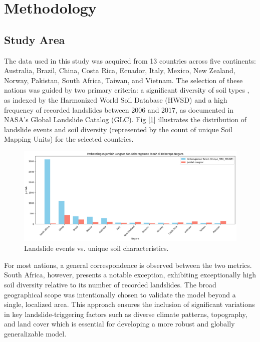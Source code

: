 \section{Methodology}




\subsection{Study Area}
The data used in this study was acquired from 13 countries across five continents: Australia, Brazil, China, Costa Rica, Ecuador, Italy, Mexico, New Zealand, Norway, Pakistan, South Africa, Taiwan, and Vietnam. The selection of these nations was guided by two primary criteria: a significant diversity of soil types , as indexed by the Harmonized World Soil Database (HWSD) and a high frequency of recorded landslides between 2006 and 2017, as documented in NASA’s Global Landslide Catalog (GLC). Fig [\ref{fig:landslide-soil-distribution}] illustrates the distribution of landslide events and soil diversity (represented by the count of unique Soil Mapping Units) for the selected countries.

\begin{figure}[htbp]
    \centerline{\includegraphics[width=\linewidth]{fig1.png}}
    \caption{Landslide events vs. unique soil characteristics.}
    \label{fig:landslide-soil-distribution}
\end{figure}


For most nations, a general correspondence is observed between the two metrics. South Africa, however, presents a notable exception, exhibiting exceptionally high soil diversity relative to its number of recorded landslides. The broad geographical scope was intentionally chosen to validate the model beyond a single, localized area. This approach ensures the inclusion of significant variations in key landslide-triggering factors such as diverse climate patterns, topography, and land cover which is essential for developing a more robust and globally generalizable model.




